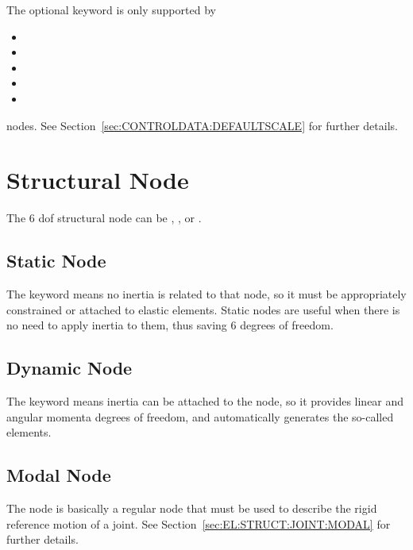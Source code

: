 The optional  keyword is only supported by
\begin{itemize}
    \item {}
    \item {}
    \item {}
    \item {}
    \item {}
\end{itemize}
nodes.
See Section~\ref{sec:CONTROLDATA:DEFAULTSCALE} for further details.




\section{Structural Node}
\label{sec:NODE:STRUCTURAL}
The 6 dof structural node can be ,
,  or .

\subsection{Static Node}
\label{sec:NODE:STRUCTURAL:STATIC}
The  keyword means no inertia is related to that node, 
so it must be appropriately constrained or attached to elastic elements.
Static nodes are useful when there is no need to apply inertia
to them, thus saving 6 degrees of freedom.

\subsection{Dynamic Node}
\label{sec:NODE:STRUCTURAL:DYNAMIC}
The  keyword means inertia can be attached to the node, 
so it provides linear and angular momenta degrees of freedom, 
and automatically generates the so-called 
elements.

\subsection{Modal Node}
\label{sec:NODE:STRUCTURAL:MODAL}
The  node is basically a regular  node
that must be used to describe the rigid reference motion
of a  joint.
See Section~\ref{sec:EL:STRUCT:JOINT:MODAL} for further details.

